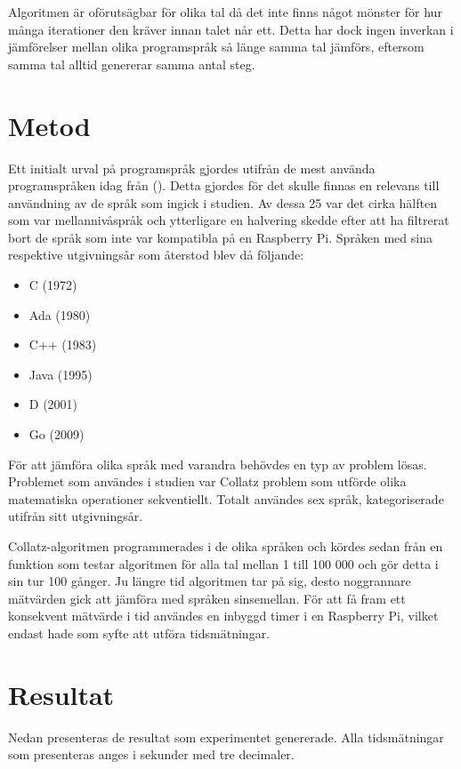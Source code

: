 \documentclass[12pt,swedish]{article}
\begin{document}
Algoritmen är oförutsägbar för olika tal då det inte finns något mönster för hur många iterationer den kräver innan talet når ett. Detta har dock ingen inverkan i jämförelser mellan olika programspråk så länge samma tal jämförs, eftersom samma tal alltid genererar samma antal steg. 


\newpage
\section{Metod}
Ett initialt urval på programspråk gjordes utifrån de mest använda programspråken idag från \citeauthor{tiobe} (\citeyear{tiobe}). Detta gjordes för det skulle finnas en relevans till användning av de språk som ingick i studien. Av dessa 25 var det cirka hälften som var mellannivåspråk och ytterligare en halvering skedde efter att ha filtrerat bort de språk som inte var kompatibla på en Raspberry Pi. Språken med sina respektive utgivningsår som återstod blev då följande:

\begin{itemize}
    \item C (1972)
    \item Ada (1980)
    \item C++ (1983)
    \item Java (1995)
    \item D (2001)
    \item Go (2009)
\end{itemize}
För att jämföra olika språk med varandra behövdes en typ av problem lösas. Problemet som användes i studien var Collatz problem som utförde olika matematiska operationer sekventiellt. Totalt användes sex språk, kategoriserade utifrån sitt utgivningsår.

Collatz-algoritmen programmerades i de olika språken och kördes sedan från en funktion som testar algoritmen för alla tal mellan 1 till 100 000 och gör detta i sin tur 100 gånger. Ju längre tid algoritmen tar på sig, desto noggrannare mätvärden gick att jämföra med språken sinsemellan. För att få fram ett konsekvent mätvärde i tid användes en inbyggd timer i en Raspberry Pi, vilket endast hade som syfte att utföra tidsmätningar.


\newpage
\section{Resultat}
Nedan presenteras de resultat som experimentet genererade. Alla tidsmätningar som presenteras anges i sekunder med tre decimaler.
\end{document}
